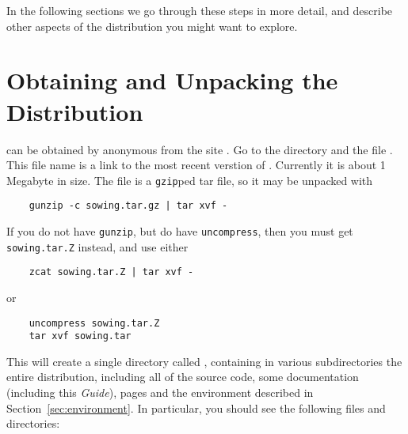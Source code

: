 \documentclass[11pt,twoside]{article}
\begin{document}
In the following
sections we go through these steps in more detail, and describe other aspects
of the  distribution you might want to explore.

\section{Obtaining and Unpacking the Distribution}
\label{sec:unpacking}

 can be obtained by anonymous  from the site
.  Go to the directory  and 
the file .  This file name is a link to the most recent
verstion of .  Currently it is about 1 Megabyte in size.  The
file is a {\tt gzip}ped tar file, so it may be unpacked with
\begin{verbatim}
    gunzip -c sowing.tar.gz | tar xvf -
\end{verbatim}
If you do not have {\tt gunzip}, but do have {\tt uncompress}, then you must
get {\tt sowing.tar.Z} instead, and use either 
\begin{verbatim}
    zcat sowing.tar.Z | tar xvf -
\end{verbatim}
or 
\begin{verbatim}
    uncompress sowing.tar.Z
    tar xvf sowing.tar
\end{verbatim}
This will create a single directory called , containing in various
subdirectories the entire distribution, including all of the source code, some
documentation (including this {\em Guide}),  pages and the 
environment described in Section~\ref{sec:environment}.
In particular, you should see the following files and directories:
\end{document}
